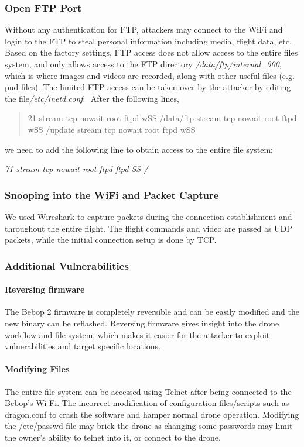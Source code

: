 \documentclass[conference]{IEEEtran}
\begin{document}
\subsubsection{Open FTP Port}
Without any authentication for FTP, attackers may connect to the WiFi and login to the FTP to steal personal information including media, flight data, etc.
Based on the factory settings, FTP access does not allow access to the entire files system, and only allows access to the FTP directory \emph{/data/ftp/internal\_000}, which is where images and videos are recorded,  along with other useful files (e.g. pud files).
The limited FTP access can be taken over by the attacker by editing the file \emph{​/etc/inetd.conf}. ​
After the following lines, 
\begin{quote}
	21 stream tcp nowait root ftpd ­wSS /data/ftp
	 stream tcp nowait root ftpd ­wSS /update
	 stream tcp nowait root ftpd ­wSS	
\end{quote}
we need to add the following line to obtain access to the entire file system:

\emph{71 stream tcp nowait root ftpd ftpd ­SS /} 

\subsubsection{Snooping into the WiFi and Packet Capture}
We used Wireshark to capture packets during the connection establishment and throughout the entire flight. The flight commands and video are passed as UDP packets, while the initial connection setup is done by TCP. 


\subsubsection{Additional Vulnerabilities}
\paragraph{Reversing firmware}
The Bebop 2 firmware is completely reversible and can be easily modified and the new binary can be reflashed. Reversing firmware gives insight into the drone workflow and file system, which makes it easier for the attacker to exploit vulnerabilities and target specific locations.
\paragraph{Modifying Files}
The entire file system can be accessed using Telnet after being connected to the Bebop's Wi-Fi.
The incorrect modification of configuration files/scripts such as dragon.conf to crash the software and hamper normal drone operation. 
Modifying the /etc/passwd file may brick the drone as changing some passwords may limit the owner's ability to telnet into it, or connect to the drone.
\end{document}
